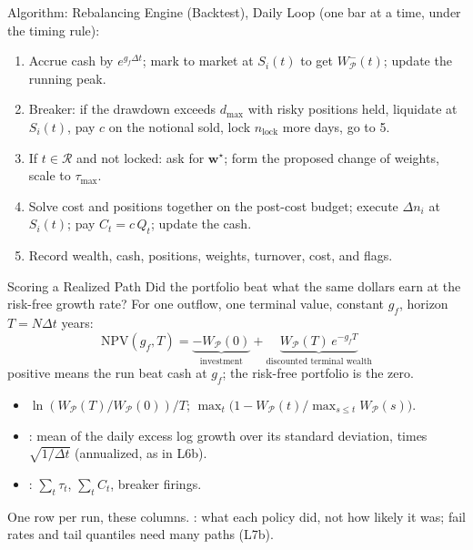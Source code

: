 \documentclass[aspectratio=169,11pt]{beamer}
\newcommand{\bw}{\mathbf{w}}
\newcommand{\Rset}{\mathcal{R}}
\newcommand{\WP}{W_{\mathcal{P}}}
\begin{document}
\begin{frame}{Algorithm: Rebalancing Engine (Backtest), Daily Loop}
  \textbf{} (one bar at a time, under the timing rule):
  \begin{enumerate}\setlength{\itemsep}{0.1em}
    \item Accrue cash by $e^{g_f\Delta t}$; mark to market at $S_i(t)$ to get
      $W^-_{\mathcal P}(t)$; update the running peak.
    \item Breaker: if the drawdown exceeds $d_{\max}$ with risky positions held,
      liquidate at $S_i(t)$, pay $c$ on the notional sold, lock $n_{\mathrm{lock}}$
      more days, go to 5.
    \item If $t\in\Rset$ and not locked: ask for $\bw^\star$; form the proposed
      change of weights, scale to $\tau_{\max}$.
    \item Solve cost and positions together on the post-cost budget; execute
      $\Delta n_i$ at $S_i(t)$; pay $C_t=c\,Q_t$; update the cash.
    \item Record wealth, cash, positions, weights, turnover, cost, and flags.
  \end{enumerate}
\end{frame}

\begin{frame}{Scoring a Realized Path}
  Did the portfolio beat what the same dollars earn at the risk-free growth rate?
  For one outflow, one terminal value, constant $g_f$, horizon $T=N\Delta t$ years:
  \[
    \boxed{\mathrm{NPV}(g_f,T)=\underbrace{-\WP(0)}_{\text{investment}}
      +\underbrace{\WP(T)\,e^{-g_fT}}_{\text{discounted terminal wealth}}}
  \]
  positive means the run beat cash at $g_f$; the risk-free portfolio is the zero.
  \begin{itemize}\setlength{\itemsep}{0.2em}
    \item {} $\ln(\WP(T)/\WP(0))/T$; 
      $\max_t\bigl(1-\WP(t)/\max_{s\le t}\WP(s)\bigr)$.
    \item {}: mean of the daily excess log growth over
      its standard deviation, times $\sqrt{1/\Delta t}$ (annualized, as in L6b).
    \item {}: $\sum_t\tau_t$, $\sum_tC_t$,
      breaker firings.
  \end{itemize}
  One row per run, these columns. : what each policy
  did, not how likely it was; fail rates and tail quantiles need many paths (L7b).
\end{frame}
\end{document}

